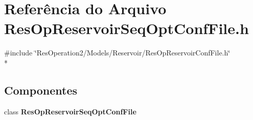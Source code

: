 \section{Referência do Arquivo Res\+Op\+Reservoir\+Seq\+Opt\+Conf\+File.\+h}
\label{_res_op_reservoir_seq_opt_conf_file_8h}
{\ttfamily \#include \char`\"{}Res\+Operation2/\+Models/\+Reservoir/\+Res\+Op\+Reservoir\+Conf\+File.\+h\char`\"{}}\\*
\subsection*{Componentes}
\begin{DoxyCompactItemize}
\item 
class {\bf Res\+Op\+Reservoir\+Seq\+Opt\+Conf\+File}
\end{DoxyCompactItemize}
